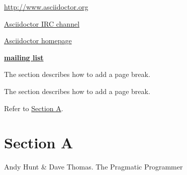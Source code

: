 \href{http://www.asciidoctor.org}{http://www.asciidoctor.org}

\href{irc://irc.freenode.org/#asciidoctor}{Asciidoctor IRC channel}

\href{view-source:asciidoctor.org}{Asciidoctor homepage}

\href{http://discuss.asciidoctor.org/}{\textbf{mailing list}}

The section \hyperlink{page-break}{} describes how to add a page break.

The section \hyperlink{page-break}{} describes how to add a page break.

Refer to \hyperlink{x-section-a}{Section A}.
\hypertarget{x-section-a}{\section*{Section A}}

Andy Hunt & Dave Thomas. The Pragmatic Programmer
